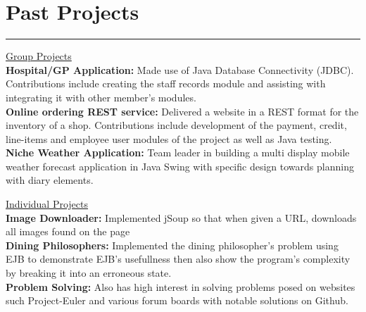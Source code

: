 \section*{\color{Maroon}Past Projects}
\hrule
\begin{multicols}{2}
	\begin{flushleft}
		\underline{Group Projects} \smallskip\\
		\textbf{Hospital/GP Application:} Made use of Java Database Connectivity (JDBC). Contributions include creating the staff records module and assisting with integrating it with other member’s modules. \smallskip\\
		\textbf{Online ordering REST service:} Delivered a  website in a REST format for the inventory of a shop. Contributions include development of the payment, credit, line-items and employee user modules of the project as well as Java testing. \smallskip\\
		\textbf{Niche Weather Application:} Team leader in building a multi display mobile weather forecast application in Java Swing with specific design towards planning with diary elements. \smallskip\\
	\end{flushleft}
	\columnbreak
	\begin{flushright}
		\underline{Individual Projects} \smallskip\\
		\textbf{Image Downloader:} Implemented jSoup so that when given a URL, downloads all images found on the page \smallskip\\
		\textbf{Dining Philosophers:} Implemented the dining philosopher's problem using EJB to demonstrate EJB's usefullness then also show the program's complexity by breaking it into an erroneous state. \smallskip\\
		\textbf{Problem Solving:} Also has high interest in solving problems posed on websites such Project-Euler and various forum boards with notable solutions on Github.
		\smallskip\\
	\end{flushright}
\end{multicols}